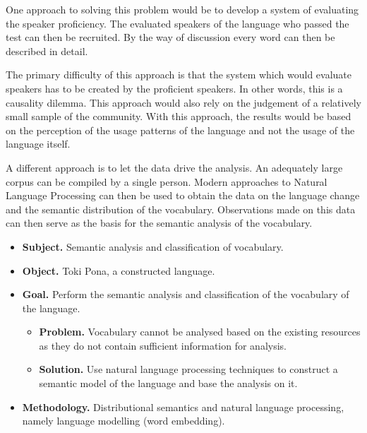 \documentclass[14pt, a4paper]{extreport}
\begin{document}
One approach to solving this problem would be to develop a system of evaluating the speaker proficiency. The evaluated speakers of the language who passed the test can then be recruited. By the way of discussion every word can then be described in detail.

The primary difficulty of this approach is that the system which would evaluate speakers has to be created by the proficient speakers. In other words, this is a causality dilemma. This approach would also rely on the judgement of a relatively small sample of the community. With this approach, the results would be based on the perception of the usage patterns of the language and not the usage of the language itself.


A different approach is to let the data drive the analysis. An adequately large corpus can be compiled by a single person. Modern approaches to Natural Language Processing can then be used to obtain the data on the language change and the semantic distribution of the vocabulary. Observations made on this data can then serve as the basis for the semantic analysis of the vocabulary.

\begin{itemize}
  \item \textbf{Subject.} Semantic analysis and classification of vocabulary.
  \item \textbf{Object.} Toki Pona, a constructed language.
  \item \textbf{Goal.} Perform the semantic analysis and classification of the vocabulary of the language.
  \begin{itemize}
    \item \textbf{Problem.} Vocabulary cannot be analysed based on the existing resources as they do not contain sufficient information for analysis.
    \item \textbf{Solution.} Use natural language processing techniques to construct a semantic model of the language and base the analysis on it.
  \end{itemize}
  \item \textbf{Methodology.} Distributional semantics and natural language processing, namely language modelling (word embedding).
\end{itemize}
\end{document}
